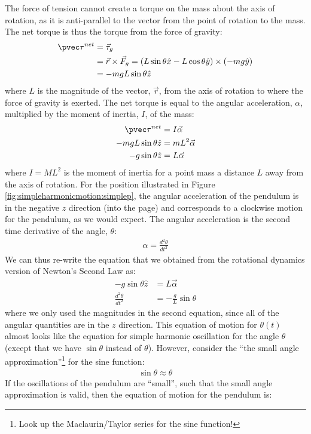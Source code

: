 The force of tension cannot create a torque on the mass about the axis of rotation, as it is anti-parallel to the vector from the point of rotation to the mass. The net torque is thus the torque from the force of gravity:
\begin{align*}
\pvec\tau^{net} &=\vec \tau_g \\
&=\vec r \times \vec F_g = (L\sin\theta \hat x - L\cos\theta \hat y) \times (-mg\hat y)\\
&=-mgL\sin\theta \hat z
\end{align*}
where $L$ is the magnitude of the vector, $\vec r$, from the axis of rotation to where the force of gravity is exerted. The net torque is equal to the angular acceleration, $\alpha$, multiplied by the moment of inertia, $I$, of the mass:
\begin{align*}
\pvec\tau^{net} &= I\vec\alpha\\
-mgL\sin\theta \hat z&= mL^2 \vec\alpha\\
-g\sin\theta \hat z&= L \vec\alpha
\end{align*}
where $I=ML^2$ is the moment of inertia for a point mass a distance $L$ away from the axis of rotation. For the position illustrated in Figure \ref{fig:simpleharmonicmotion:simplep}, the angular acceleration of the pendulum is in the negative $z$ direction (into the page) and corresponds to a clockwise motion for the pendulum, as we would expect. The angular acceleration is the second time derivative of the angle, $\theta$:
\begin{align*}
\alpha = \frac{d^2\theta}{dt^2}
\end{align*}
We can thus re-write the equation that we obtained from the rotational dynamics version of Newton's Second Law as:
\begin{align*}
-g\sin\theta \hat z&= L \vec\alpha\\
\frac{d^2\theta}{dt^2} &= -\frac{g}{L}\sin\theta
\end{align*}
where we only used the magnitudes in the second equation, since all of the angular quantities are in the $z$ direction. This equation of motion for $\theta(t)$ almost looks like the equation for simple harmonic oscillation for the angle $\theta$ (except that we have $\sin\theta$ instead of $\theta$). However, consider the ``the small angle approximation''\footnote{Look up the Maclaurin/Taylor series for the sine function!} for the sine function:
\begin{align*}
\sin\theta \approx \theta 
\end{align*}
If the oscillations of the pendulum are ``small'', such that the small angle approximation is valid, then the equation of motion for the pendulum is:
